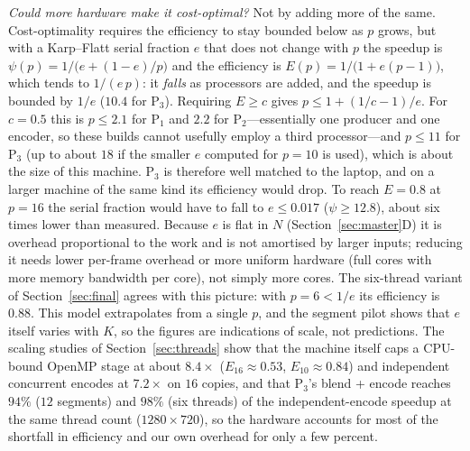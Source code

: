 \documentclass[conference]{IEEEtran}
\begin{document}
\emph{Could more hardware make it cost-optimal?} Not by adding more of the same. Cost-optimality requires the efficiency to stay bounded below as $p$ grows, but with a Karp--Flatt serial fraction $e$ that does not change with $p$ the speedup is $\psi(p)=1/\big(e+(1-e)/p\big)$ and the efficiency is $E(p)=1/\big(1+e(p-1)\big)$, which tends to $1/(e\,p)$: it \emph{falls} as processors are added, and the speedup is bounded by $1/e$ ($10.4$ for P$_3$). Requiring $E\ge c$ gives $p\le 1+(1/c-1)/e$. For $c=0.5$ this is $p\le 2.1$ for P$_1$ and $2.2$ for P$_2$---essentially one producer and one encoder, so these builds cannot usefully employ a third processor---and $p\le 11$ for P$_3$ (up to about $18$ if the smaller $e$ computed for $p=10$ is used), which is about the size of this machine. P$_3$ is therefore well matched to the laptop, and on a larger machine of the same kind its efficiency would drop. To reach $E=0.8$ at $p=16$ the serial fraction would have to fall to $e\le 0.017$ ($\psi\ge12.8$), about six times lower than measured. Because $e$ is flat in $N$ (Section~\ref{sec:master}D) it is overhead proportional to the work and is not amortised by larger inputs; reducing it needs lower per-frame overhead or more uniform hardware (full cores with more memory bandwidth per core), not simply more cores. The six-thread variant of Section~\ref{sec:final} agrees with this picture: with $p=6<1/e$ its efficiency is $0.88$. This model extrapolates from a single $p$, and the segment pilot shows that $e$ itself varies with $K$, so the figures are indications of scale, not predictions. The scaling studies of Section~\ref{sec:threads} show that the machine itself caps a CPU-bound OpenMP stage at about $8.4\times$ ($E_{16}\approx0.53$, $E_{10}\approx0.84$) and independent concurrent encodes at $7.2\times$ on $16$ copies, and that P$_3$'s blend + encode reaches $94\%$ ($12$ segments) and $98\%$ (six threads) of the independent-encode speedup at the same thread count ($1280\times720$), so the hardware accounts for most of the shortfall in efficiency and our own overhead for only a few percent.
\end{document}
